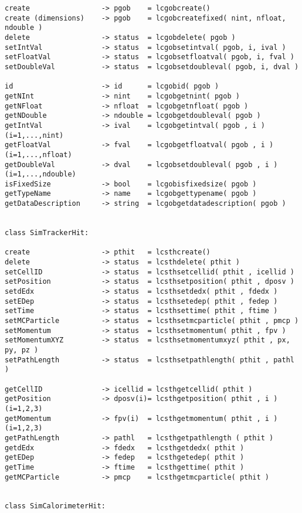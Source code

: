 \begin{scriptsize}
\begin{verbatim}
create                 -> pgob    = lcgobcreate()
create (dimensions)    -> pgob    = lcgobcreatefixed( nint, nfloat, ndouble )
delete                 -> status  = lcgobdelete( pgob )
setIntVal              -> status  = lcgobsetintval( pgob, i, ival )
setFloatVal            -> status  = lcgobsetfloatval( pgob, i, fval )
setDoubleVal           -> status  = lcgobsetdoubleval( pgob, i, dval )

id                     -> id      = lcgobid( pgob )
getNInt                -> nint    = lcgobgetnint( pgob )
getNFloat              -> nfloat  = lcgobgetnfloat( pgob )
getNDouble             -> ndouble = lcgobgetdoubleval( pgob )
getIntVal              -> ival    = lcgobgetintval( pgob , i )      (i=1,...,nint)
getFloatVal            -> fval    = lcgobgetfloatval( pgob , i )    (i=1,...,nfloat)
getDoubleVal           -> dval    = lcgobsetdoubleval( pgob , i )   (i=1,...,ndouble)
isFixedSize            -> bool    = lcgobisfixedsize( pgob )
getTypeName            -> name    = lcgobgettypename( pgob )
getDataDescription     -> string  = lcgobgetdatadescription( pgob )


class SimTrackerHit:

create                 -> pthit   = lcsthcreate()
delete                 -> status  = lcsthdelete( pthit )
setCellID              -> status  = lcsthsetcellid( pthit , icellid )
setPosition            -> status  = lcsthsetposition( pthit , dposv )
setdEdx                -> status  = lcsthsetdedx( pthit , fdedx )
setEDep                -> status  = lcsthsetedep( pthit , fedep )
setTime                -> status  = lcsthsettime( pthit , ftime )
setMCParticle          -> status  = lcsthsetmcparticle( pthit , pmcp )
setMomentum            -> status  = lcsthsetmomentum( pthit , fpv )
setMomentumXYZ         -> status  = lcsthsetmomentumxyz( pthit , px, py, pz )
setPathLength          -> status  = lcsthsetpathlength( pthit , pathl )

getCellID              -> icellid = lcsthgetcellid( pthit )
getPosition            -> dposv(i)= lcsthgetposition( pthit , i ) (i=1,2,3)
getMomentum            -> fpv(i)  = lcsthgetmomentum( pthit , i ) (i=1,2,3)
getPathLength          -> pathl   = lcsthgetpathlength ( pthit )
getdEdx                -> fdedx   = lcsthgetdedx( pthit )
getEDep                -> fedep   = lcsthgetedep( pthit )
getTime                -> ftime   = lcsthgettime( pthit )
getMCParticle          -> pmcp    = lcsthgetmcparticle( pthit )


class SimCalorimeterHit:


\end{verbatim}
\end{scriptsize}
